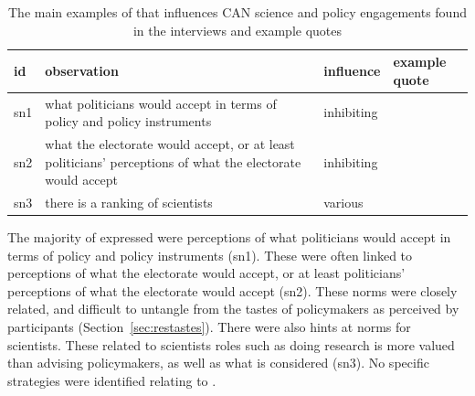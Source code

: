\subsubsection{\ismsn}\label{sec:resnorms}


\begin{table}[!ht]
\footnotesize
\caption{The main examples of \ismsn{} that influences CAN science and policy engagements found in the interviews and example quotes}\label{tab:resnorms}
\begin{tabular}{L{.06\linewidth}L{.3\linewidth}L{.12\linewidth}L{.52\linewidth}} \hline
\textbf{id} & \textbf{observation} & \textbf{influence} & \textbf{example quote} \\ \hline \hline 
sn1 & what politicians would accept in terms of policy and policy instruments & inhibiting &  \\[5mm]
sn2 & what the electorate would accept, or at least politicians' perceptions of what the electorate would accept & inhibiting &  \\[5mm]
sn3 & there is a ranking of scientists
 & various &  \\[5mm]
 \hline
\end{tabular}
\end{table}

The majority of \ismsn{} expressed were perceptions of what politicians would accept in terms of policy and policy instruments (sn1). These were often linked to perceptions of what the electorate would accept, or at least politicians' perceptions of what the electorate would accept (sn2). These norms were closely related, and difficult to untangle from the tastes of policymakers as perceived by participants (Section~\ref{sec:restastes}). There were also hints at norms for scientists. These related to scientists roles such as doing research is more valued than advising policymakers, as well as what is considered  (sn3). No specific strategies were identified relating to \ismsn.

